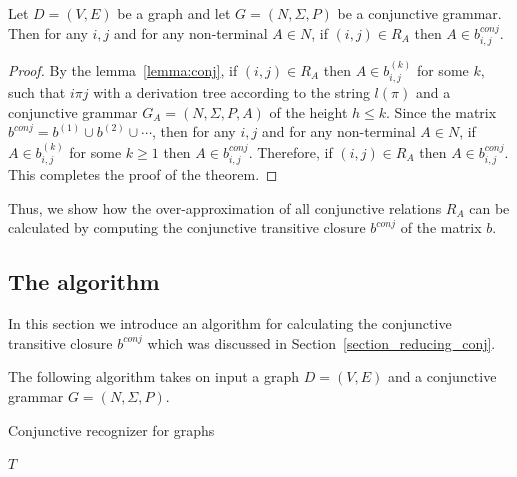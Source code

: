 \begin{mytheorem}\label{thm:correct_conj}
	Let $D = (V,E)$ be a graph and let $G =(N,\Sigma,P)$ be a conjunctive grammar. Then for any $i, j$ and for any non-terminal $A \in N$, if $(i,j) \in R_A$ then $A \in b^{conj}_{i,j}$.
\end{mytheorem}
\begin{proof}
	
	By the lemma~\ref{lemma:conj}, if $(i,j) \in R_A$ then $A \in b^{(k)}_{i,j}$ for some $k$, such that $i \pi j$ with a derivation tree according to the string $l(\pi)$ and a conjunctive grammar $G_A = (N,\Sigma,P,A)$ of the height $h \leq k$. Since the matrix $b^{conj} = b^{(1)} \cup b^{(2)} \cup \cdots$, then for any $i, j$ and for any non-terminal $A \in N$, if $A \in b^{(k)}_{i,j}$ for some $k \geq 1$ then  $A \in b^{conj}_{i,j}$. Therefore, if $(i,j) \in R_A$ then $A \in b^{conj}_{i,j}$. This completes the proof of the theorem.
\end{proof}

Thus, we show how the over-approximation of all conjunctive relations $R_A$ can be calculated by computing the conjunctive transitive closure $b^{conj}$ of the matrix $b$.



\subsection{The algorithm} \label{section_algorithm_conj}
In this section we introduce an algorithm for calculating the conjunctive transitive closure $b^{conj}$ which was discussed in Section~\ref{section_reducing_conj}.

The following algorithm takes on input a graph $D = (V, E)$ and a conjunctive grammar $G = (N,\Sigma,P)$.

\begin{algorithm}[H]
	\begin{algorithmic}[1]
		\caption{Conjunctive recognizer for graphs}
		\label{alg:graphParse_conj}
		
		\EndFor    
		
		\EndWhile
		\State \Return $T$    
		\EndFunction
	\end{algorithmic}
\end{algorithm}

